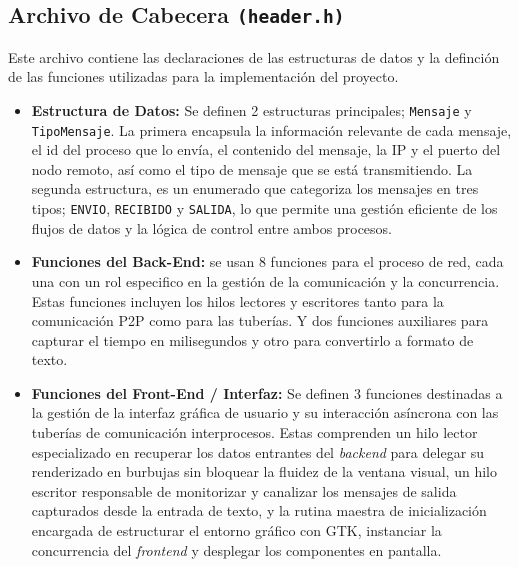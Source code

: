 \subsection{\large Archivo de Cabecera \texttt{(header.h)}}
Este archivo contiene las declaraciones de las estructuras de datos y la definción de las funciones utilizadas para la implementación del proyecto. 
\begin{itemize}
    \item \textbf{Estructura de Datos:} Se definen 2 estructuras principales; \texttt{Mensaje} y \texttt{TipoMensaje}. La primera encapsula la información relevante de cada mensaje, el id del proceso que lo envía, el contenido del mensaje, la IP y el puerto del nodo remoto, así como el tipo de mensaje que se está transmitiendo. La segunda estructura, es un enumerado que categoriza los mensajes en tres tipos; \texttt{ENVIO}, \texttt{RECIBIDO} y \texttt{SALIDA}, lo que permite una gestión eficiente de los flujos de datos y la lógica de control entre ambos procesos.
    \item \textbf{Funciones del Back-End:} se usan 8 funciones para el proceso de red, cada una con un rol especifico en la gestión de la comunicación y la concurrencia. Estas funciones incluyen los hilos lectores y escritores tanto para la comunicación P2P como para las tuberías. Y dos funciones auxiliares para capturar el tiempo en milisegundos y otro para convertirlo a formato de texto.
    \item \textbf{Funciones del Front-End / Interfaz:} Se definen 3 funciones destinadas a la gestión de la interfaz gráfica de usuario y su interacción asíncrona con las tuberías de comunicación interprocesos. Estas comprenden un hilo lector especializado en recuperar los datos entrantes del \textit{backend} para delegar su renderizado en burbujas sin bloquear la fluidez de la ventana visual, un hilo escritor responsable de monitorizar y canalizar los mensajes de salida capturados desde la entrada de texto, y la rutina maestra de inicialización encargada de estructurar el entorno gráfico con GTK, instanciar la concurrencia del \textit{frontend} y desplegar los componentes en pantalla.
\end{itemize}

